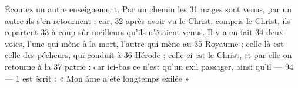 Écoutez un autre enseignement. Par un chemin les	 
31	 	mages sont venus, par un autre ils s'en retournent ; car,	 
32	 	après avoir vu le Christ, compris le Christ, ils repartent	 
33	 	à coup sûr meilleurs qu'ils n'étaient venus. Il y a en fait	 
34	 	deux voies, l'une qui mène à la mort, l'autre qui mène au	 
35	 	Royaume ; celle-là est celle des pécheurs, qui conduit à	 
36	 	Hérode ; celle-ci est le Christ, et par elle on retourne à la	 
37	 	patrie : car ici-bas ce n'est qu'un exil passager, ainsi qu'il	 
 	--- 94 ---	 
1	 	est écrit : « Mon âme a été longtemps exilée »